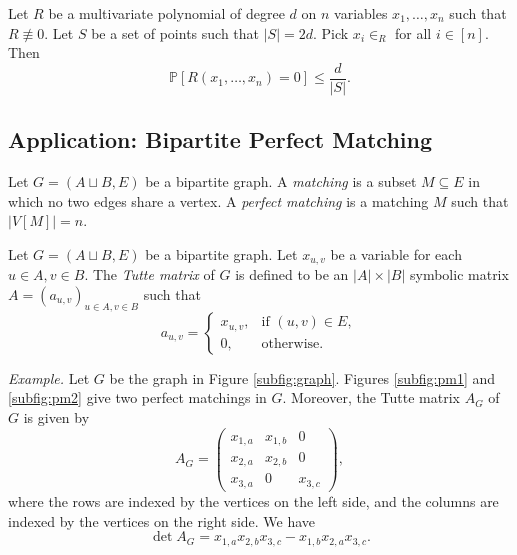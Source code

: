 \documentclass[letterpaper, reqno,11pt]{article}
\newcommand{\PP}{\mathbb{P}}
\begin{document}
\begin{theorem}
  Let $R$ be a multivariate polynomial of degree $d$ on $n$ variables $x_1, \ldots, x_n$ such that $R \not \equiv 0$. Let $S$ be a set of points such that $|S| = 2d$. Pick $x_i \in_R$ for all $i \in [n]$. Then
  $$ \PP\left[R\left(x_1, \ldots, x_n\right) = 0\right] \leq \frac{d}{|S|}. $$
\end{theorem}

\subsection{Application: Bipartite Perfect Matching}

\begin{definition}
  Let $G = (A \sqcup B, E)$ be a bipartite graph. A \emph{matching} is a subset $M \subseteq E$ in which no two edges share a vertex. A \emph{perfect matching} is a matching $M$ such that $|V[M]| = n$.
\end{definition}

\begin{definition}
  Let $G = (A \sqcup B, E)$ be a bipartite graph. Let $x_{u, v}$ be a variable for each $u \in A, v \in B$. The \emph{Tutte matrix} of $G$ is defined to be an $|A| \times |B|$ symbolic matrix $A = (a_{u, v})_{u \in A, v \in B}$ such that
  $$ a_{u, v} = \left\{
    \begin{array}{ll}
      x_{u, v}, & \text{if $(u, v) \in E$}, \\
      0, & \text{otherwise}.
    \end{array}
  \right. $$
\end{definition}

\noindent\emph{Example.} Let $G$ be the graph in Figure \ref{subfig:graph}. Figures \ref{subfig:pm1} and \ref{subfig:pm2} give two perfect matchings in $G$. Moreover, the Tutte matrix $A_G$ of $G$ is given by
$$ A_G = \begin{pmatrix}
  x_{1, a} & x_{1, b} & 0 \\
  x_{2, a} & x_{2, b} & 0 \\
  x_{3, a} & 0 & x_{3, c}
\end{pmatrix}, $$
where the rows are indexed by the vertices on the left side, and the columns are indexed by the vertices on the right side. We have
$$ \det A_G = x_{1, a} x_{2, b} x_{3, c} - x_{1, b} x_{2, a} x_{3, c}. $$
\end{document}
